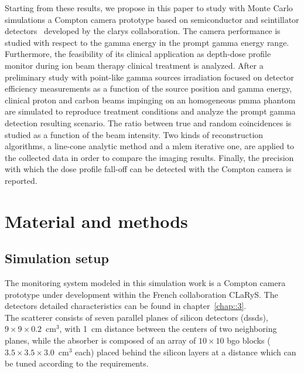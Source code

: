Starting from these results, we propose in this paper to study with Monte Carlo simulations a Compton camera prototype based on semiconductor and scintillator detectors~\cite{Krimmer2015, Fontana2018} developed by the \gls{clarys} collaboration.
The camera performance is studied with respect to the gamma energy in the prompt gamma energy range. Furthermore, the feasibility of its clinical application as depth-dose profile monitor during ion beam therapy clinical treatment is analyzed. After a preliminary study with point-like gamma sources irradiation focused on detector efficiency measurements as a function of the source position and gamma energy, clinical proton and carbon beams impinging on an homogeneous \gls{pmma} phantom are simulated to reproduce treatment conditions and analyze the prompt gamma detection resulting scenario. The ratio between true and random coincidences is studied as a function of the beam intensity. Two kinds of reconstruction algorithms, a line-cone analytic method and a \gls{mlem} iterative one, are applied to the collected data in order to compare the imaging results. Finally, the precision with which the dose profile fall-off can be detected with the Compton camera is reported.   


\section{Material and methods}\label{chap4::sec::MatMet}

\subsection{Simulation setup}\label{chap4::subsec::SimuSetup}

The monitoring system modeled in this simulation work is a Compton camera prototype under development within the French collaboration CLaRyS. The detectors detailed characteristics can be found in chapter~\ref{chap::3}.\\
The scatterer consists of seven parallel planes of silicon detectors (\glspl{dssd}), $9\times9\times0.2$~cm$^3$, with 1~cm distance between the centers of two neighboring planes, while the absorber is composed of an array of $10\times10$ \gls{bgo} blocks ($3.5\times3.5\times3.0$~cm$^3$ each) placed behind the silicon layers at a distance which can be tuned according to the requirements.

